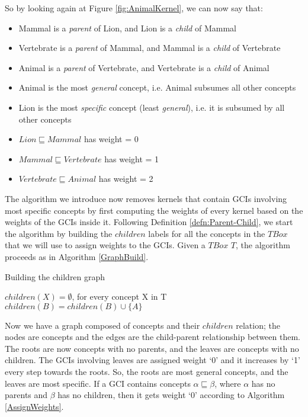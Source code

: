 So by looking again at Figure \ref{fig:AnimalKernel}, we can now say that:
\begin{itemize}
\item Mammal is a \textit{parent} of Lion, and Lion is a \textit{child} of Mammal
\item Vertebrate is a \textit{parent} of Mammal, and Mammal is a \textit{child} of Vertebrate
\item Animal is a \textit{parent} of Vertebrate, and Vertebrate is a \textit{child} of Animal
\item Animal is the most \textit{general} concept, i.e. Animal subsumes all other concepts
\item Lion is the most \textit{specific} concept (least \textit{general}), i.e. it is subsumed by all other concepts
\item $Lion \sqsubseteq Mammal$ has weight = 0
\item $Mammal \sqsubseteq Vertebrate$ has weight = 1
\item $Vertebrate \sqsubseteq Animal$ has weight = 2
\end{itemize}

The algorithm we introduce now removes kernels that contain GCIs involving most specific concepts by first computing the weights of every kernel based on the weights of the GCIs inside it. Following Definition \ref{defn:Parent-Child}, we start the algorithm by building the $children$ labels for all the concepts in the $TBox$ that we will use to assign weights to the GCIs. Given a $TBox$ $T$, the algorithm proceeds as in Algorithm \ref{GraphBuild}.

\begin{algorithm}
\caption{Building the children graph}
\label{GraphBuild}
\begin{algorithmic}[1]
\State $children(X) = \emptyset$, for every concept X in T 
\State $children(B) = children(B) \cup \{ A \}$
\EndFor
\EndFunction
\end{algorithmic}
\end{algorithm}

Now we have a graph composed of concepts and their $children$ relation; the nodes are concepts and the edges are the child-parent relationship between them. The roots are now concepts with no parents, and the leaves are concepts with no children. The GCIs involving leaves are assigned weight `0' and it increases by `1' every step towards the roots. So, the roots are most general concepts, and the leaves are most specific. If a GCI contains concepts $\alpha \sqsubseteq \beta$, where $\alpha$ has no parents and $\beta$ has no children, then it gets weight `0' according to Algorithm \ref{AssignWeights}.

